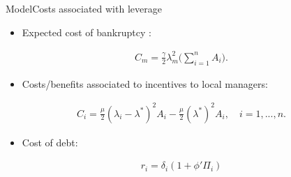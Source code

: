 \documentclass{beamer}
\begin{document}
\begin{frame}{Model}{Costs associated with leverage}
\begin{itemize}
	\item  Expected cost of bankruptcy \citep{luciano2014guarantees}:
\end{itemize}
\begin{equation}
\begin{aligned}
C_m=\frac{\gamma}{2}\lambda_m^2\bigg(\sum_{i=1}^{n}A_i\bigg).
\end{aligned}
\label{eq:cost bankruptcy}
\end{equation}
\begin{itemize}
\item  Costs/benefits associated to incentives to local managers:
\end{itemize}
\begin{equation}
\begin{aligned}
C_i=\frac{\mu}{2}(\lambda_i-\lambda^*)^2A_i-\frac{\mu}{2}(\lambda^*)^2A_i, \quad i=1,...,n.
\end{aligned}
\label{eq:agency cost}
\end{equation}
\begin{itemize}
	\item  Cost of debt:
\end{itemize}
\begin{equation}
\begin{aligned}
r_i=\delta_i(1+\phi'\Pi_i)
\end{aligned}
\label{eq:cost of debt}
\end{equation}

\end{frame}
\end{document}
